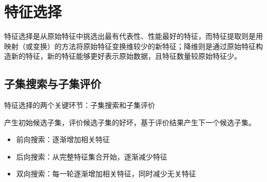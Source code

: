 
\section{特征选择}
特征选择是从原始特征中挑选出最有代表性、性能最好的特征，而特征提取则是用映射（或变换）的方法将原始特征变换维较少的新特征；降维则是通过原始特征构造新的特征，新的特征能够更好表示原始数据，且特征数量较原始特征少。

\subsection{子集搜索与子集评价}
特征选择的两个关键环节：子集搜索和子集评价

产生初始候选子集，评价候选子集的好坏，基于评价结果产生下一个候选子集。
\begin{itemize}
	\item 前向搜索：逐渐增加相关特征
	\item 后向搜索：从完整特征集合开始，逐渐减少特征
	\item 双向搜索：每一轮逐渐增加相关特征，同时减少无关特征
\end{itemize}

